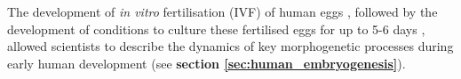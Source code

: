 The development of \textit{in vitro} fertilisation (IVF) of human eggs \cite{edwards1969early, rock1944vitro, shettles1955morula}, followed by the development of conditions to culture these fertilised eggs for up to 5-6 days \cite{edwards1970fertilization, steptoe1971human},
allowed scientists to describe the dynamics of key morphogenetic processes during early human development (see \textbf{section \ref{sec:human_embryogenesis}}).
\\



